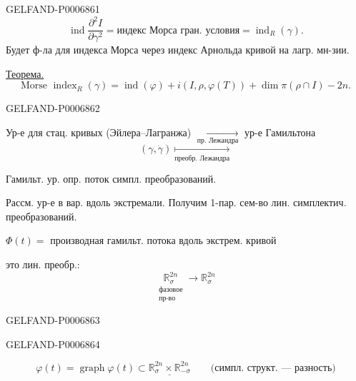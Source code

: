 \begin{GelfandAdjacentEvidence}{GELFAND-P000686}{1}
\[
\operatorname{ind}\frac{\partial^2 I}{\partial\gamma^2}
=\text{индекс Морса гран. условия}=\operatorname{ind}_R(\gamma).
\]
Будет ф-ла для индекса Морса через индекс Арнольда кривой на лагр. мн-зии.

\underline{Теорема.}
\[
\text{Morse }\operatorname{index}_R(\gamma)
=\operatorname{ind}(\varphi)+i(I,\rho,\varphi(T))
  +\dim\pi(\rho\cap I)-2n.
\]
\end{GelfandAdjacentEvidence}
\begin{GelfandAdjacentEvidence}{GELFAND-P000686}{2}


\noindent Ур-е для стац. кривых (Эйлера--Лагранжа)
\(\underset{\text{пр. Лежандра}}{\longrightarrow}\)
ур-е Гамильтона
\[
(\gamma,\dot\gamma)\underset{\text{преобр. Лежандра}}{\mapsto}
\]

Гамильт. ур. опр. поток симпл. преобразований.

Рассм. ур-е в вар. вдоль экстремали. Получим 1-пар. сем-во лин. симплектич. преобразований.

\(\Phi(t)=\) производная гамильт. потока вдоль экстрем. кривой

это лин. преобр.:
\[
\underset{\substack{\text{фазовое}\\\text{пр-во}}}{\mathbb R_\sigma^{2n}}
\longrightarrow \mathbb R_\sigma^{2n}
\]
\end{GelfandAdjacentEvidence}
\begin{GelfandAdjacentEvidence}{GELFAND-P000686}{3}

\end{GelfandAdjacentEvidence}
\begin{GelfandAdjacentEvidence}{GELFAND-P000686}{4}

\[
\varphi(t)=\operatorname{graph}\varphi(t)\subset
\underline{\mathbb R_\sigma^{2n}\times\mathbb R_{-\sigma}^{2n}}
\qquad \text{(симпл. структ. --- разность)}
\]
\end{GelfandAdjacentEvidence}
